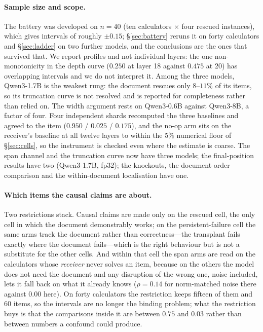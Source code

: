 \documentclass{article}
\begin{document}
\paragraph{Sample size and scope.} The battery was developed on $n=40$ (ten
calculators $\times$ four rescued instances), which gives intervals of roughly
$\pm 0.15$; \S\ref{sec:battery} reruns it on forty calculators and
\S\ref{sec:ladder} on two further models, and the conclusions are the ones that
survived that. We report profiles and not individual layers: the one
non-monotonicity in the depth curve ($0.250$ at layer 18 against $0.475$ at 20)
has overlapping intervals and we do not interpret it. Among the three models,
Qwen3-1.7B is the weakest rung: the document rescues only $8$--$11\%$ of its
items, so its truncation curve is not resolved and is reported for completeness
rather than relied on. The width argument rests on Qwen3-0.6B against Qwen3-8B,
a factor of four.
Four independent shards recomputed the three baselines and agreed to the item
($0.950$ / $0.025$ / $0.175$), and the no-op arm sits on the receiver's baseline
at all twelve layers to within the $5\%$ numerical floor of
\S\ref{sec:cells}, so the instrument is checked even where the estimate is
coarse. The span channel and the truncation curve now have three
models; the final-position results have two (Qwen3-1.7B, fp32); the knockouts,
the document-order comparison and the within-document localisation have one.

\paragraph{Which items the causal claims are about.} Two restrictions stack.
Causal claims are made only on the rescued cell, the only cell in which the
document demonstrably works; on the persistent-failure cell the same arms track
the document rather than correctness---the transplant fails exactly where the
document fails---which is the right behaviour but is not a substitute for the
other cells. And within that cell the span arms are read on the calculators
whose \emph{receiver} never solves an item, because on the others the model does
not need the document and any disruption of the wrong one, noise included, lets
it fall back on what it already knows ($\rho = 0.14$ for norm-matched noise
there against $0.00$ here). On forty calculators the restriction keeps fifteen of them and
$60$ items, so the intervals are no longer the binding problem; what the
restriction buys is that the comparisons inside it are between $0.75$ and
$0.03$ rather than between numbers a confound could produce.
\end{document}
